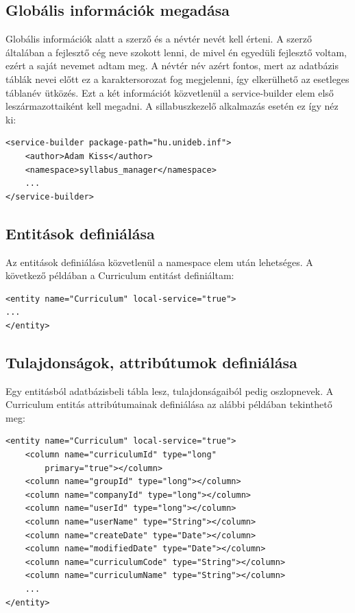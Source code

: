 \documentclass[hidelinks, 12pt, a4paper]{report}
\begin{document}
\subsection{Globális információk megadása}

Globális információk alatt a szerző és a névtér nevét kell érteni. A szerző általában a fejlesztő cég neve szokott lenni, de mivel én egyedüli fejlesztő voltam, ezért a saját nevemet adtam meg. A névtér név azért fontos, mert az adatbázis táblák nevei előtt ez a karaktersorozat fog megjelenni, így elkerülhető az esetleges táblanév ütközés. Ezt a két információt közvetlenül a service-builder elem első leszármazottaiként kell megadni. A sillabuszkezelő alkalmazás esetén ez így néz ki:

\begin{minipage}{\linewidth}
\begin{lstlisting}[basicstyle=\small]
<service-builder package-path="hu.unideb.inf">
	<author>Adam Kiss</author>
	<namespace>syllabus_manager</namespace>
	...
</service-builder>
\end{lstlisting}
\end{minipage}

\subsection{Entitások definiálása}

Az entitások definiálása közvetlenül a namespace elem után lehetséges. A következő példában a Curriculum entitást definiáltam:

\begin{minipage}{\linewidth}
\begin{lstlisting}[basicstyle=\small]
<entity name="Curriculum" local-service="true">
...
</entity>
\end{lstlisting}
\end{minipage}

\subsection{Tulajdonságok, attribútumok definiálása}

Egy entitásból adatbázisbeli tábla lesz, tulajdonságaiból pedig oszlopnevek. A Curriculum entitás attribútumainak definiálása az alábbi példában tekinthető meg:

\begin{minipage}{\linewidth}
\begin{lstlisting}[basicstyle=\small]
<entity name="Curriculum" local-service="true">
	<column name="curriculumId" type="long"
		primary="true"></column>
	<column name="groupId" type="long"></column>
	<column name="companyId" type="long"></column>
	<column name="userId" type="long"></column>
	<column name="userName" type="String"></column>
	<column name="createDate" type="Date"></column>
	<column name="modifiedDate" type="Date"></column>
	<column name="curriculumCode" type="String"></column>
	<column name="curriculumName" type="String"></column>
	...
</entity>
\end{lstlisting}
\end{minipage}
\end{document}
